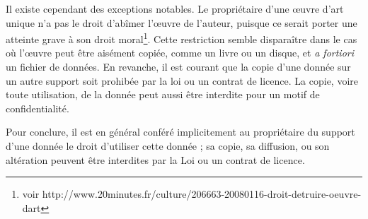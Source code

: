 Il existe cependant des exceptions notables. Le propriétaire d'une
œuvre d'art unique n'a pas le droit d'abîmer l'œuvre de l'auteur,
puisque ce serait porter une atteinte grave à son droit
moral\footnote{voir
  http://www.20minutes.fr/culture/206663-20080116-droit-detruire-oeuvre-dart}. Cette
restriction semble disparaître dans le cas où l'œuvre peut être
aisément copiée, comme un livre ou un disque, et \emph{a fortiori} un
fichier de données. En revanche, il est courant que la copie d'une
donnée sur un autre support soit prohibée par la loi ou un contrat de
licence. La copie, voire toute utilisation, de la donnée peut aussi
être interdite pour un motif de confidentialité.

Pour conclure, il est en général conféré implicitement au propriétaire
du support d'une donnée le droit d'utiliser cette donnée ; sa copie,
sa diffusion, ou son altération peuvent être interdites par la Loi ou
un contrat de licence.



